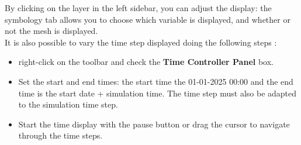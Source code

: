 By clicking on the layer in the left sidebar, you can adjust the display: the symbology tab allows you to choose which variable is displayed, and whether or not the mesh is displayed.\\

It is also possible to vary the time step displayed doing the following steps :

\begin{itemize}
  \item right-click on the toolbar and check the \textbf{Time Controller Panel} box.
  \item Set the start and end times: the start time the 01-01-2025 00:00 and the end time is the start date + simulation time. The time step must also be adapted to the simulation time step.
  \item Start the time display with the pause button or drag the cursor to navigate through the time steps.
\end{itemize}